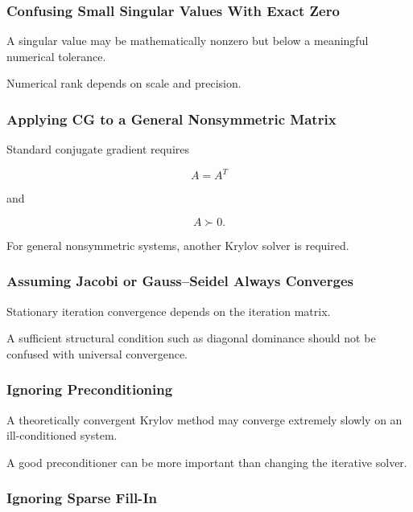 \subsubsection{Confusing Small Singular Values With Exact Zero}

A singular value may be mathematically nonzero but below a meaningful
numerical tolerance.

Numerical rank depends on scale and precision.

\subsubsection{Applying CG to a General Nonsymmetric Matrix}

Standard conjugate gradient requires

\[
\boxed{
A=A^T
}
\]

and

\[
\boxed{
A\succ0.
}
\]

For general nonsymmetric systems, another Krylov solver is required.

\subsubsection{Assuming Jacobi or Gauss--Seidel Always Converges}

Stationary iteration convergence depends on the iteration matrix.

A sufficient structural condition such as diagonal dominance should not be
confused with universal convergence.

\subsubsection{Ignoring Preconditioning}

A theoretically convergent Krylov method may converge extremely slowly on
an ill-conditioned system.

A good preconditioner can be more important than changing the iterative
solver.

\subsubsection{Ignoring Sparse Fill-In}

